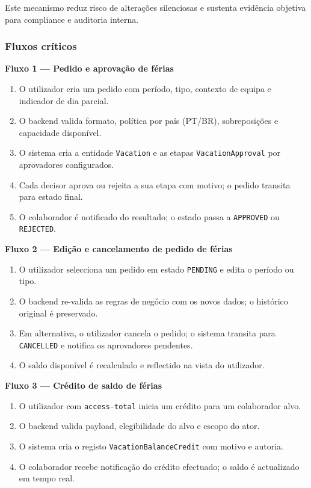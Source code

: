 \documentclass[11pt,a4paper,twoside]{article}
\begin{document}
Este mecanismo reduz risco de alterações silenciosas e sustenta evidência objetiva para compliance e auditoria interna.

\subsubsection{Fluxos críticos}

\textbf{Fluxo 1 — Pedido e aprovação de férias}
\begin{enumerate}
  \item O utilizador cria um pedido com período, tipo, contexto de equipa e indicador de dia parcial.
  \item O backend valida formato, política por país (PT/BR), sobreposições e capacidade disponível.
  \item O sistema cria a entidade \texttt{Vacation} e as etapas \texttt{VacationApproval} por aprovadores configurados.
  \item Cada decisor aprova ou rejeita a sua etapa com motivo; o pedido transita para estado final.
  \item O colaborador é notificado do resultado; o estado passa a \texttt{APPROVED} ou \texttt{REJECTED}.
\end{enumerate}

\textbf{Fluxo 2 — Edição e cancelamento de pedido de férias}
\begin{enumerate}
  \item O utilizador selecciona um pedido em estado \texttt{PENDING} e edita o período ou tipo.
  \item O backend re-valida as regras de negócio com os novos dados; o histórico original é preservado.
  \item Em alternativa, o utilizador cancela o pedido; o sistema transita para \texttt{CANCELLED} e notifica os aprovadores pendentes.
  \item O saldo disponível é recalculado e reflectido na vista do utilizador.
\end{enumerate}

\textbf{Fluxo 3 — Crédito de saldo de férias}
\begin{enumerate}
  \item O utilizador com \texttt{access-total} inicia um crédito para um colaborador alvo.
  \item O backend valida payload, elegibilidade do alvo e escopo do ator.
  \item O sistema cria o registo \texttt{VacationBalanceCredit} com motivo e autoria.
  \item O colaborador recebe notificação do crédito efectuado; o saldo é actualizado em tempo real.
\end{enumerate}
\end{document}
